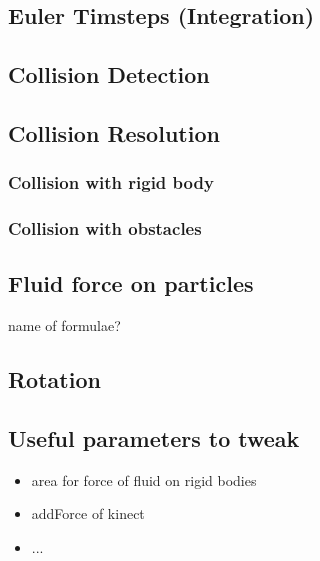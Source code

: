 \subsection{Euler Timsteps (Integration)}
\subsection{Collision Detection}
\subsection{Collision Resolution}
\subsubsection{Collision with rigid body}
\subsubsection{Collision with obstacles}
\subsection{Fluid force on particles}
name of formulae?
\subsection{Rotation}


\subsection{Useful parameters to tweak}
\begin{itemize}
\item area for force of fluid on rigid bodies
\item addForce of kinect
\item ...
\end{itemize}
